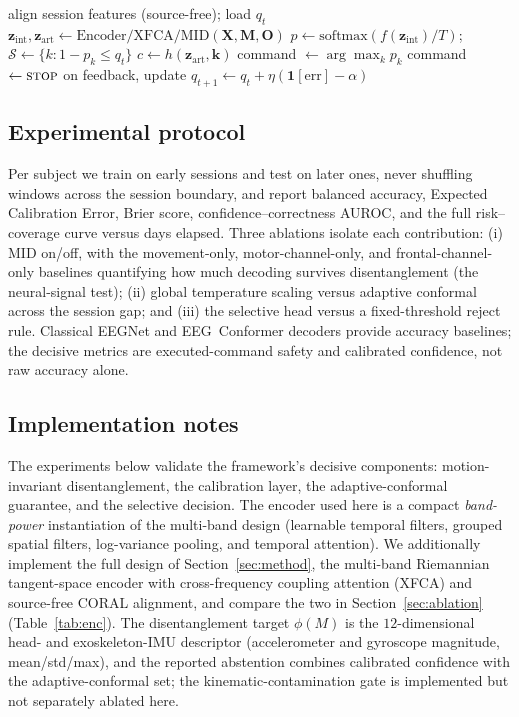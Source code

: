 \documentclass[journal]{IEEEtran}
\begin{document}
\begin{algorithm}[t]
\caption{CALM-Net deployment on session $s$ (per window)}
\label{alg:deploy}
\begin{algorithmic}[1]
\State align session features (source-free); load $q_t$
\State $\mathbf{z}_{\mathrm{int}},\mathbf{z}_{\mathrm{art}}\leftarrow \mathrm{Encoder/XFCA/MID}(\mathbf{X},\mathbf{M},\mathbf{O})$
\State $p\leftarrow \mathrm{softmax}(f(\mathbf{z}_{\mathrm{int}})/T)$;\quad
       $\mathcal{S}\leftarrow\{k:1-p_k\le q_t\}$
\State $c\leftarrow h(\mathbf{z}_{\mathrm{art}},\mathbf{k})$
   \State command $\leftarrow \arg\max_k p_k$
\Else
   \State command $\leftarrow \textsc{stop}$ 
\EndIf
\State on feedback, update $q_{t+1}\leftarrow q_t+\eta(\mathbf{1}[\text{err}]-\alpha)$
\end{algorithmic}
\end{algorithm}

\subsection{Experimental protocol}
Per subject we train on early sessions and test on later ones, never shuffling
windows across the session boundary, and report balanced accuracy, Expected
Calibration Error, Brier score, confidence--correctness AUROC, and the full
risk--coverage curve versus days elapsed. Three ablations isolate each contribution:
(i) MID on/off, with the movement-only, motor-channel-only, and frontal-channel-only
baselines quantifying how much decoding survives disentanglement (the neural-signal
test); (ii) global temperature scaling versus adaptive conformal across the session
gap; and (iii) the selective head versus a fixed-threshold reject rule. Classical
EEGNet and EEG~Conformer decoders provide accuracy baselines; the decisive metrics
are executed-command safety and calibrated confidence, not raw accuracy alone.

\subsection{Implementation notes}
The experiments below validate the framework's decisive components: motion-invariant
disentanglement, the calibration layer, the adaptive-conformal guarantee, and the
selective decision. The encoder used here is a compact \emph{band-power}
instantiation of the multi-band design (learnable temporal filters, grouped spatial
filters, log-variance pooling, and temporal attention). We additionally implement the
full design of Section~\ref{sec:method}, the multi-band Riemannian tangent-space
encoder with cross-frequency coupling attention (XFCA) and source-free CORAL
alignment, and compare the two in Section~\ref{sec:ablation}
(Table~\ref{tab:enc}). The disentanglement target $\phi(M)$ is the $12$-dimensional head- and
exoskeleton-IMU descriptor (accelerometer and gyroscope magnitude, mean/std/max), and
the reported abstention combines calibrated confidence with the adaptive-conformal
set; the kinematic-contamination gate is implemented but not separately ablated here.
\end{document}
